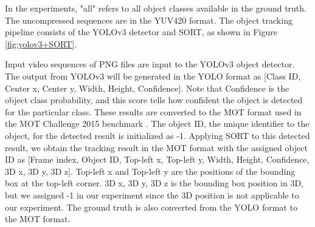 
In the experiments, "all" refers to all object classes available in the ground truth. The uncompressed sequences are in the YUV420 format. The object tracking pipeline consists of the YOLOv3 detector and SORT, as shown in Figure \ref{fig:yolov3+SORT}. 

Input video sequences of PNG files are input to the YOLOv3 object detector. The output from YOLOv3 will be generated in the YOLO format as [Class ID, Center x, Center y, Width, Height, Confidence]. Note that Confidence is the object class probability, and this score tells how confident the object is detected for the particular class. These results are converted to the MOT format used in the MOT Challenge 2015 benchmark \cite{leal-taixe_motchallenge_2015}. The object ID, the unique identifier to the object, for the detected result is initialized as -1. Applying SORT to this detected result, we obtain the tracking result in the MOT format with the assigned object ID as [Frame index, Object ID, Top-left x, Top-left y, Width, Height, Confidence, 3D x, 3D y, 3D z]. Top-left x and Top-left y are the positions of the bounding box at the top-left corner. 3D x, 3D y, 3D z is the bounding box position in 3D, but we assigned -1 in our experiment since the 3D position is not applicable to our experiment. The ground truth is also converted from the YOLO format to the MOT format.





